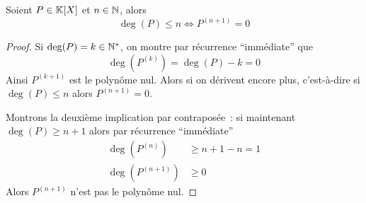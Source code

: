 \begin{prop}
  Soient \(P \in \mathbb{K}[X]\) et \(n \in \mathbb{N}\), alors
  \begin{equation}
    \deg(P) \leqslant n \iff P^{(n+1)} = 0
  \end{equation}
\end{prop}
\begin{proof}
  Si \(\deg(P) = k \in \mathbb{N}^*\), on montre par récurrence ``immédiate'' que
  \begin{equation}
    \deg(P^{(k)}) = \deg(P)-k = 0
  \end{equation}
  Ainsi \(P^{(k+1)}\) est le polynôme nul. Alors si on dérivent encore plus,
  c'est-à-dire si \(\deg(P) \leqslant n\) alors \(P^{(n+1)} = 0\).

  Montrons la deuxième implication par contraposée~: si maintenant \(\deg(P)
  \geqslant n+1\) alors par récurrence ``immédiate''
  \begin{align}
    \deg(P^{(n)}) &\geqslant n+1-n = 1 \\
    \deg(P^{(n+1)}) &\geqslant 0
  \end{align}
Alors \(P^{(n+1)}\) n'est pas le polynôme nul. \end{proof}

